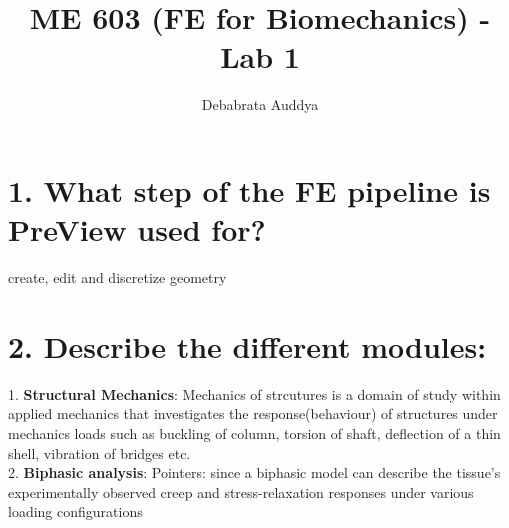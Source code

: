 \documentclass[a4paper,oneside,11pt]{report}
\title{ME 603 (FE for Biomechanics) - Lab 1}
\author{Debabrata Auddya}
\begin{document}
\maketitle
\section*{1. What step of the FE pipeline is PreView used for?}
create, edit and discretize geometry
\section*{2. Describe the different modules:}
1. \textbf{Structural Mechanics}:
Mechanics of strcutures is a domain of study within applied mechanics that investigates the response(behaviour) of structures under mechanics loads such as buckling of column, torsion of shaft, deflection of a thin shell, vibration of bridges etc.\\
2. \textbf{Biphasic analysis}:
Pointers: since a
biphasic model can describe the tissue’s experimentally observed creep and stress-relaxation
responses under various loading configurations 
\end{document}
